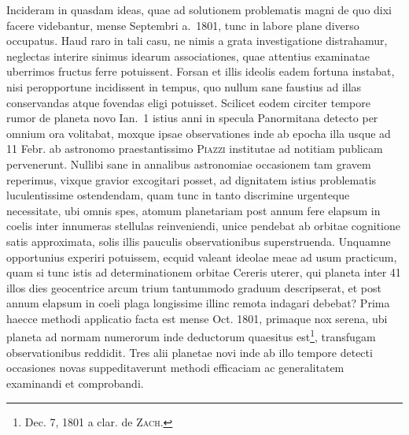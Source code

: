 Incideram in quasdam ideas, quae ad solutionem problematis magni de quo dixi facere videbantur, mense Septembri a.\ 1801, tunc in labore plane diverso occupatus. Haud raro in tali casu, ne nimis a grata investigatione distrahamur, neglectas interire sinimus idearum associationes, quae attentius examinatae uberrimos fructus ferre potuissent. Forsan et illis ideolis eadem fortuna instabat, nisi peropportune incidissent in tempus, quo nullum sane faustius ad illas conservandas atque fovendas eligi potuisset. Scilicet eodem circiter tempore rumor de planeta novo Ian.\ 1 istius anni in specula Panormitana detecto per omnium ora volitabat, moxque ipsae observationes inde ab
epocha illa usque ad 11 Febr. ab astronomo praestantissimo \textsc{Piazzi} institutae ad notitiam publicam pervenerunt. Nullibi sane in annalibus astronomiae occasionem tam gravem reperimus, vixque gravior excogitari posset, ad dignitatem istius problematis luculentissime ostendendam, quam tunc in tanto discrimine urgenteque necessitate, ubi omnis spes, atomum planetariam post annum fere elapsum in coelis inter innumeras stellulas reinveniendi, unice pendebat ab orbitae cognitione satis approximata, solis illis pauculis observationibus superstruenda. Unquamne opportunius experiri potuissem, ecquid valeant ideolae meae ad usum practicum, quam si tunc istis ad determinationem orbitae Cereris uterer, qui planeta inter 41 illos dies geocentrice arcum trium tantummodo graduum descripserat, et post annum elapsum in coeli plaga longissime illinc remota indagari debebat? Prima haecce methodi applicatio facta est mense Oct. 1801, primaque nox serena, ubi planeta ad normam numerorum inde deductorum quaesitus est\footnote{Dec. 7, 1801 a clar. de \textsc{Zach}.}, transfugam observationibus reddidit. Tres alii planetae novi inde ab illo tempore detecti occasiones novas suppeditaverunt methodi efficaciam ac generalitatem examinandi et comprobandi.

